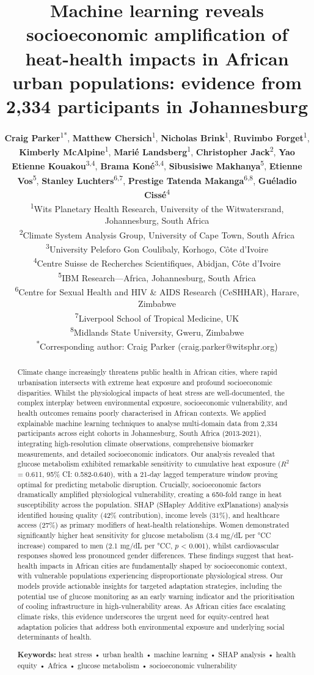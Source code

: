 \documentclass[11pt,a4paper]{article}
\title{\Large \textbf{Machine learning reveals socioeconomic amplification of heat-health impacts in African urban populations: evidence from 2,334 participants in Johannesburg}}
\author{
\textbf{Craig Parker}\textsuperscript{1*}, 
\textbf{Matthew Chersich}\textsuperscript{1}, 
\textbf{Nicholas Brink}\textsuperscript{1}, 
\textbf{Ruvimbo Forget}\textsuperscript{1}, 
\textbf{Kimberly McAlpine}\textsuperscript{1}, 
\textbf{Mari\'{e} Landsberg}\textsuperscript{1},
\textbf{Christopher Jack}\textsuperscript{2}, 
\textbf{Yao Etienne Kouakou}\textsuperscript{3,4}, 
\textbf{Brama Kon\'{e}}\textsuperscript{3,4}, 
\textbf{Sibusisiwe Makhanya}\textsuperscript{5}, 
\textbf{Etienne Vos}\textsuperscript{5}, 
\textbf{Stanley Luchters}\textsuperscript{6,7}, 
\textbf{Prestige Tatenda Makanga}\textsuperscript{6,8}, 
\textbf{Gu\'{e}ladio Ciss\'{e}}\textsuperscript{4}\\[0.5em]
\small
\textsuperscript{1}Wits Planetary Health Research, University of the Witwatersrand, Johannesburg, South Africa\\
\textsuperscript{2}Climate System Analysis Group, University of Cape Town, South Africa\\
\textsuperscript{3}University Peleforo Gon Coulibaly, Korhogo, C\^{o}te d'Ivoire\\
\textsuperscript{4}Centre Suisse de Recherches Scientifiques, Abidjan, C\^{o}te d'Ivoire\\
\textsuperscript{5}IBM Research---Africa, Johannesburg, South Africa\\
\textsuperscript{6}Centre for Sexual Health and HIV \& AIDS Research (CeSHHAR), Harare, Zimbabwe\\
\textsuperscript{7}Liverpool School of Tropical Medicine, UK\\
\textsuperscript{8}Midlands State University, Gweru, Zimbabwe\\[0.5em]
\textsuperscript{*}Corresponding author: Craig Parker (craig.parker@witsphr.org)
}
\date{}
\newcommand{\degrees}{°C}
\begin{document}
\maketitle

\begin{abstract}
\noindent Climate change increasingly threatens public health in African cities, where rapid urbanisation intersects with extreme heat exposure and profound socioeconomic disparities. Whilst the physiological impacts of heat stress are well-documented, the complex interplay between environmental exposure, socioeconomic vulnerability, and health outcomes remains poorly characterised in African contexts. We applied explainable machine learning techniques to analyse multi-domain data from 2,334 participants across eight cohorts in Johannesburg, South Africa (2013-2021), integrating high-resolution climate observations, comprehensive biomarker measurements, and detailed socioeconomic indicators. Our analysis revealed that glucose metabolism exhibited remarkable sensitivity to cumulative heat exposure ($R^2$ = 0.611, 95\% CI: 0.582-0.640), with a 21-day lagged temperature window proving optimal for predicting metabolic disruption. Crucially, socioeconomic factors dramatically amplified physiological vulnerability, creating a 650-fold range in heat susceptibility across the population. SHAP (SHapley Additive exPlanations) analysis identified housing quality (42\% contribution), income levels (31\%), and healthcare access (27\%) as primary modifiers of heat-health relationships. Women demonstrated significantly higher heat sensitivity for glucose metabolism (3.4 mg/dL per \degrees C increase) compared to men (2.1 mg/dL per \degrees C, $p$ < 0.001), whilst cardiovascular responses showed less pronounced gender differences. These findings suggest that heat-health impacts in African cities are fundamentally shaped by socioeconomic context, with vulnerable populations experiencing disproportionate physiological stress. Our models provide actionable insights for targeted adaptation strategies, including the potential use of glucose monitoring as an early warning indicator and the prioritisation of cooling infrastructure in high-vulnerability areas. As African cities face escalating climate risks, this evidence underscores the urgent need for equity-centred heat adaptation policies that address both environmental exposure and underlying social determinants of health.

\vspace{0.5em}
\noindent \textbf{Keywords:} heat stress • urban health • machine learning • SHAP analysis • health equity • Africa • glucose metabolism • socioeconomic vulnerability
\end{abstract}
\end{document}
